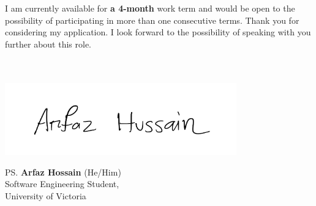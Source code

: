 \documentclass[a4paper, 12pt, oneside]{letter}
\newcommand{\Terms}{a 4-month}
\begin{document}
I am currently available for \textbf{\Terms} work term and would be open to the possibility of participating in more than one consecutive terms. Thank you for considering my application. I look forward to the possibility of speaking with you further about this role. \\\\\\
\vspace{10pt}
\vspace{-25pt}\begin{flushleft}
\hspace*{-1cm}\includegraphics[width=10cm]{../../9.2 PreProcessed/0 Resources/signature.png}\vspace{-1cm}
\end{flushleft}
\vspace{-10pt}\ps{\textbf{Arfaz Hossain} (He/Him)\\
Software Engineering Student,\\
University of Victoria} 
\end{document}
